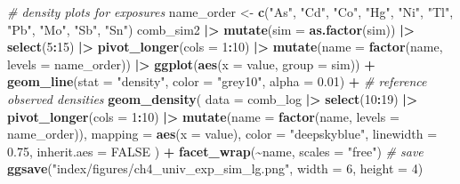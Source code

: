 \documentclass[12pt, twoside]{amherstthesis}
\newenvironment{Shaded}{\begin{snugshade}}{\end{snugshade}}
\newcommand{\AttributeTok}[1]{\textcolor[rgb]{0.13,0.29,0.53}{#1}}
\newcommand{\CommentTok}[1]{\textcolor[rgb]{0.56,0.35,0.01}{\textit{#1}}}
\newcommand{\ConstantTok}[1]{\textcolor[rgb]{0.56,0.35,0.01}{#1}}
\newcommand{\DecValTok}[1]{\textcolor[rgb]{0.00,0.00,0.81}{#1}}
\newcommand{\FloatTok}[1]{\textcolor[rgb]{0.00,0.00,0.81}{#1}}
\newcommand{\FunctionTok}[1]{\textcolor[rgb]{0.13,0.29,0.53}{\textbf{#1}}}
\newcommand{\NormalTok}[1]{#1}
\newcommand{\OtherTok}[1]{\textcolor[rgb]{0.56,0.35,0.01}{#1}}
\newcommand{\SpecialCharTok}[1]{\textcolor[rgb]{0.81,0.36,0.00}{\textbf{#1}}}
\newcommand{\StringTok}[1]{\textcolor[rgb]{0.31,0.60,0.02}{#1}}
\begin{document}
\scriptsize
\begin{Shaded}
\begin{Highlighting}[]
\CommentTok{\# density plots for exposures}
\NormalTok{name\_order }\OtherTok{\textless{}{-}} \FunctionTok{c}\NormalTok{(}\StringTok{"As"}\NormalTok{, }\StringTok{"Cd"}\NormalTok{, }\StringTok{"Co"}\NormalTok{, }\StringTok{"Hg"}\NormalTok{, }\StringTok{"Ni"}\NormalTok{, }\StringTok{"Tl"}\NormalTok{, }\StringTok{"Pb"}\NormalTok{, }\StringTok{"Mo"}\NormalTok{, }\StringTok{"Sb"}\NormalTok{, }\StringTok{"Sn"}\NormalTok{)}
\NormalTok{comb\_sim2 }\SpecialCharTok{|\textgreater{}} 
  \FunctionTok{mutate}\NormalTok{(}\AttributeTok{sim =} \FunctionTok{as.factor}\NormalTok{(sim)) }\SpecialCharTok{|\textgreater{}} 
  \FunctionTok{select}\NormalTok{(}\DecValTok{5}\SpecialCharTok{:}\DecValTok{15}\NormalTok{) }\SpecialCharTok{|\textgreater{}} 
  \FunctionTok{pivot\_longer}\NormalTok{(}\AttributeTok{cols =} \DecValTok{1}\SpecialCharTok{:}\DecValTok{10}\NormalTok{) }\SpecialCharTok{|\textgreater{}}
  \FunctionTok{mutate}\NormalTok{(}\AttributeTok{name =} \FunctionTok{factor}\NormalTok{(name, }\AttributeTok{levels =}\NormalTok{ name\_order)) }\SpecialCharTok{|\textgreater{}} 
  \FunctionTok{ggplot}\NormalTok{(}\FunctionTok{aes}\NormalTok{(}\AttributeTok{x =}\NormalTok{ value, }\AttributeTok{group =}\NormalTok{ sim)) }\SpecialCharTok{+}
  \FunctionTok{geom\_line}\NormalTok{(}\AttributeTok{stat =} \StringTok{"density"}\NormalTok{, }\AttributeTok{color =} \StringTok{"grey10"}\NormalTok{, }\AttributeTok{alpha =} \FloatTok{0.01}\NormalTok{) }\SpecialCharTok{+} 
  \CommentTok{\# reference observed densities}
  \FunctionTok{geom\_density}\NormalTok{(}
    \AttributeTok{data =}\NormalTok{ comb\_log }\SpecialCharTok{|\textgreater{}} \FunctionTok{select}\NormalTok{(}\DecValTok{10}\SpecialCharTok{:}\DecValTok{19}\NormalTok{) }\SpecialCharTok{|\textgreater{}} \FunctionTok{pivot\_longer}\NormalTok{(}\AttributeTok{cols =} \DecValTok{1}\SpecialCharTok{:}\DecValTok{10}\NormalTok{) }\SpecialCharTok{|\textgreater{}} 
      \FunctionTok{mutate}\NormalTok{(}\AttributeTok{name =} \FunctionTok{factor}\NormalTok{(name, }\AttributeTok{levels =}\NormalTok{ name\_order)),}
    \AttributeTok{mapping =} \FunctionTok{aes}\NormalTok{(}\AttributeTok{x =}\NormalTok{ value), }
    \AttributeTok{color =} \StringTok{"deepskyblue"}\NormalTok{, }\AttributeTok{linewidth =} \FloatTok{0.75}\NormalTok{, }\AttributeTok{inherit.aes =} \ConstantTok{FALSE}
\NormalTok{  ) }\SpecialCharTok{+}
  \FunctionTok{facet\_wrap}\NormalTok{(}\SpecialCharTok{\textasciitilde{}}\NormalTok{name, }\AttributeTok{scales =} \StringTok{"free"}\NormalTok{)}
\CommentTok{\# save}
\FunctionTok{ggsave}\NormalTok{(}\StringTok{"index/figures/ch4\_univ\_exp\_sim\_lg.png"}\NormalTok{, }\AttributeTok{width =} \DecValTok{6}\NormalTok{, }\AttributeTok{height =} \DecValTok{4}\NormalTok{)}
\end{Highlighting}
\end{Shaded}
\normalsize
\end{document}
